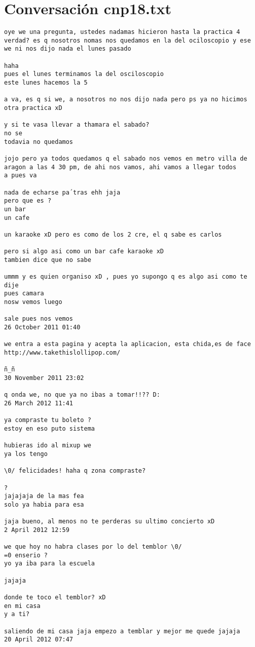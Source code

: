 \section{Conversaci\'on cnp18.txt}
\begin{verbatim}
oye we una pregunta, ustedes nadamas hicieron hasta la practica 4 verdad? es q nosotros nomas nos quedamos en la del ociloscopio y ese we ni nos dijo nada el lunes pasado

haha
pues el lunes terminamos la del osciloscopio
este lunes hacemos la 5

a va, es q si we, a nosotros no nos dijo nada pero ps ya no hicimos otra practica xD

y si te vasa llevar a thamara el sabado?
no se
todavia no quedamos

jojo pero ya todos quedamos q el sabado nos vemos en metro villa de aragon a las 4 30 pm, de ahi nos vamos, ahi vamos a llegar todos
a pues va

nada de echarse pa´tras ehh jaja
pero que es ?
un bar
un cafe

un karaoke xD pero es como de los 2 cre, el q sabe es carlos

pero si algo asi como un bar cafe karaoke xD
tambien dice que no sabe

ummm y es quien organiso xD , pues yo supongo q es algo asi como te dije
pues camara
nosw vemos luego

sale pues nos vemos
26 October 2011 01:40

we entra a esta pagina y acepta la aplicacion, esta chida,es de face http://www.takethislollipop.com/

ñ_ñ
30 November 2011 23:02

q onda we, no que ya no ibas a tomar!!?? D:
26 March 2012 11:41

ya compraste tu boleto ?
estoy en eso puto sistema

hubieras ido al mixup we
ya los tengo 

\0/ felicidades! haha q zona compraste?

?
jajajaja de la mas fea
solo ya habia para esa

jaja bueno, al menos no te perderas su ultimo concierto xD
2 April 2012 12:59

we que hoy no habra clases por lo del temblor \0/
=0 enserio ?
yo ya iba para la escuela

jajaja

donde te toco el temblor? xD
en mi casa
y a ti?

saliendo de mi casa jaja empezo a temblar y mejor me quede jajaja
20 April 2012 07:47


\end{verbatim}
